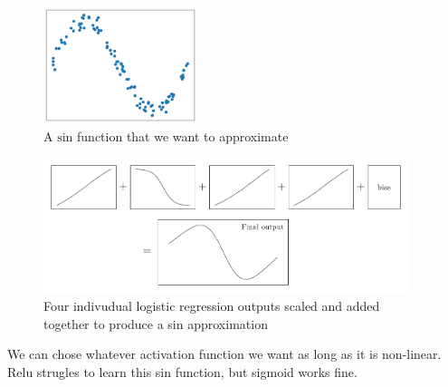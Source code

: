 \documentclass[twoside,11pt]{report}
\begin{document}
\begin{figure}
    \begin{center}
        \includegraphics[width=0.4\textwidth]{../runsAndFigures/sin.png}
    \end{center}
    \caption{A $\text{sin}$ function that we want to approximate}\label{fig:sin}
\end{figure}

\begin{figure}
    \begin{center}
        \includegraphics[width=0.95\textwidth]{tikzfigures/universal.pdf}
    \end{center}
    \caption{Four indivudual logistic regression outputs scaled and added together to produce 
    a sin approximation}\label{fig:universal}
\end{figure}


We can chose whatever activation function we want as long as it is non-linear. Relu strugles to learn this 
sin function, but sigmoid works fine.











\vskip 0.2in

% 

%
\end{document}
